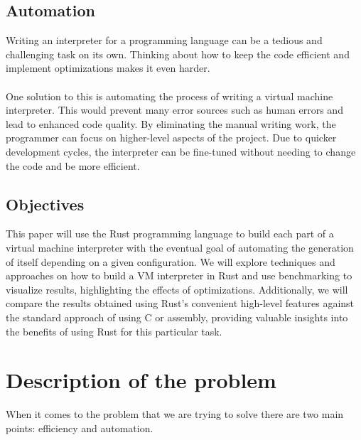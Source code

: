 \documentclass{article}
\begin{document}
\subsection{Automation}
Writing an interpreter for a programming language can be a tedious and
challenging task on its own. Thinking about how to keep the code efficient and
implement optimizations makes it even harder.
\\ \\ 
One solution to this is automating the process of writing a virtual machine
interpreter. This would prevent many error sources such as human errors and
lead to enhanced code quality. By eliminating the manual writing work, the
programmer can focus on higher-level aspects of the project. Due to quicker
development cycles, the interpreter can be fine-tuned without needing to change
the code and be more efficient.

\subsection{Objectives} 
This paper will use the Rust programming language to build each part of a
virtual machine interpreter with the eventual goal of automating the generation
of itself depending on a given configuration. We will explore techniques and
approaches on how to build a VM interpreter in Rust and use benchmarking to
visualize results, highlighting the effects of optimizations. Additionally, we
will compare the results obtained using Rust's convenient high-level features
against the standard approach of using C or assembly, providing valuable
insights into the benefits of using Rust for this particular task.

\section{Description of the problem}
When it comes to the problem that we are trying to solve there are two main
points: efficiency and automation.
\end{document}
